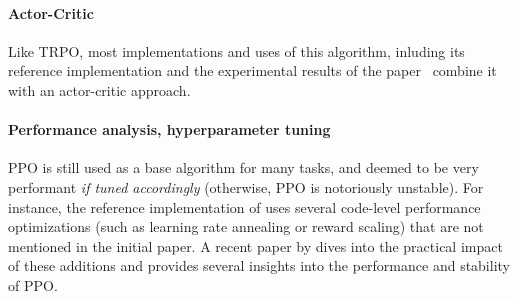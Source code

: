 \documentclass[../course-notes.tex]{subfiles}
\begin{document}
\paragraph{Actor-Critic} Like TRPO, most implementations and uses of this algorithm, inluding its reference implementation\footnotemark[1]{} and the experimental results of the paper~\cite{schulman2017proximal} combine it with an actor-critic approach.


\paragraph{Performance analysis, hyperparameter tuning} PPO is still used as a base algorithm for many tasks, and deemed to be very performant \textit{if tuned accordingly} (otherwise, PPO is notoriously unstable). For instance, the reference implementation\footnotemark[1]{} of \citeauthor{schulman2015trust} uses several code-level performance optimizations (such as learning rate annealing or reward scaling) that are not mentioned in the initial paper. A recent paper by \textcite{ilyas2018deep} dives into the practical impact of these additions and provides several insights into the performance and stability of PPO.
\end{document}
